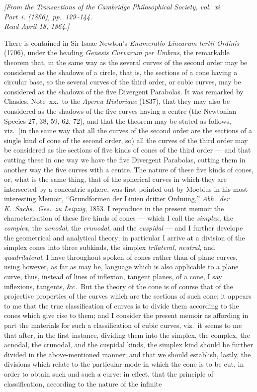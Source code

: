 \documentclass[11pt,a4paper]{article}
\theoremstyle{plain}
\begin{document}
\begin{flushright}
\textit{[From the Transactions of the Cambridge Philosophical Society, vol.~xi.\\
Part~i. (1866), pp.~129--144.\\
Read April 18, 1864.]}
\end{flushright}

There is contained in Sir Isaac Newton's \textit{Enumeratio Linearum tertii Ordinis} (1706), under the heading \textit{Genesis Curvarum per Umbras}, the remarkable theorem that, in the same way as the several curves of the second order may be considered as the shadows of a circle, that is, the sections of a cone having a circular base, so the several curves of the third order, or cubic curves, may be considered as the shadows of the five Divergent Parabolas. It was remarked by Chasles, Note~xx.\ to the \textit{Apercu Historique} (1837), that they may also be considered as the shadows of the five curves having a centre (the Newtonian Species 27, 38, 59, 62, 72), and that the theorem may be stated as follows, viz.\ (in the same way that all the curves of the second order are the sections of a single kind of cone of the second order, so) all the curves of the third order may be considered as the sections of five kinds of cones of the third order --- and that cutting these in one way we have the five Divergent Parabolas, cutting them in another way the five curves with a centre. The nature of these five kinds of cones, or, what is the same thing, that of the spherical curves in which they are intersected by a concentric sphere, was first pointed out by Moebius in his most interesting Memoir, ``Grundformen der Linien dritter Ordnung,'' \textit{Abh.\ der K.\ Sachs.\ Ges.\ zu Leipzig}, 1853. I reproduce in the present memoir the characterisation of these five kinds of cones --- which I call the \textit{simplex}, the \textit{complex}, the \textit{acnodal}, the \textit{crunodal}, and the \textit{cuspidal} --- and I further develope the geometrical and analytical theory; in particular I arrive at a division of the simplex cones into three subkinds, the simplex \textit{trilateral}, \textit{neutral}, and \textit{quadrilateral}. I have throughout spoken of cones rather than of plane curves, using however, as far as may be, language which is also applicable to a plane curve, thus, instead of lines of inflexion, tangent planes, of a cone, I say inflexions, tangents, \&c.\ But the theory of the cone is of course that of the projective properties of the curves which are the sections of such cone; it appears to me that the true classification of curves is to divide them according to the cones which give rise to them; and I consider the present memoir as affording in part the materials for such a classification of cubic curves, viz.\ it seems to me that after, in the first instance, dividing them into the simplex, the complex, the acnodal, the crunodal, and the cuspidal kinds, the simplex kind should be further divided in the above-mentioned manner; and that we should establish, lastly, the divisions which relate to the particular mode in which the cone is to be cut, in order to obtain such and such a curve: in effect, that the principle of classification, according to the nature of the infinite 
\end{document}
